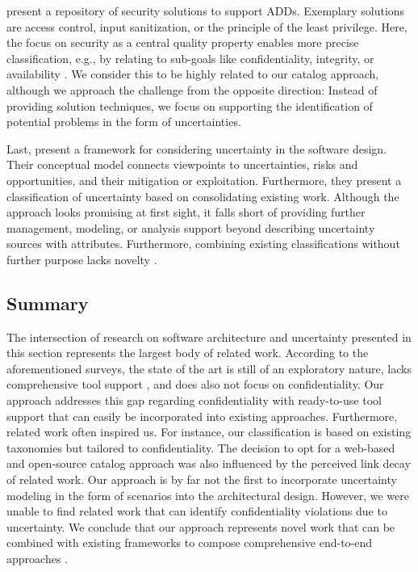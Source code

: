 \textcite{jasser_reusing_2016} present a repository of security solutions to support \acp{ADD}.
Exemplary solutions are access control, input sanitization, or the principle of the least privilege.
Here, the focus on security as a central quality property enables more precise classification, e.g., by relating to sub-goals like confidentiality, integrity, or availability \cite{international_organization_for_standardization_isoiec_2018}.
We consider this to be highly related to our catalog approach, although we approach the challenge from the opposite direction: Instead of providing solution techniques, we focus on supporting the identification of potential problems in the form of uncertainties.

Last, \textcite{lupafya_framework_2022} present a framework for considering uncertainty in the software design.
Their conceptual model connects viewpoints to uncertainties, risks and opportunities, and their mitigation or exploitation.
Furthermore, they present a classification of uncertainty based on consolidating existing work.
Although the approach looks promising at first sight, it falls short of providing further management, modeling, or analysis support beyond describing uncertainty sources with attributes.
Furthermore, combining existing classifications without further purpose lacks novelty \cite{kaplan_introducing_2022}.


\subsection{Summary}

The intersection of research on software architecture and uncertainty presented in this section represents the largest body of related work.
According to the aforementioned surveys, the state of the art is still of an exploratory nature, lacks comprehensive tool support \cite{troya_uncertainty_2021,hezavehi_uncertainty_2021}, and does also not focus on confidentiality.
Our approach addresses this gap regarding confidentiality with ready-to-use tool support that can easily be incorporated into existing approaches.
Furthermore, related work often inspired us.
For instance, our classification is based on existing taxonomies but tailored to confidentiality.
The decision to opt for a web-based and open-source catalog approach was also influenced by the perceived link decay \cite{goh_link_2007} of related work.
Our approach is by far not the first to incorporate uncertainty modeling in the form of scenarios into the architectural design.
However, we were unable to find related work that can identify confidentiality violations due to uncertainty.
We conclude that our approach represents novel work that can be combined with existing frameworks to compose comprehensive end-to-end approaches \cite{weyns_introduction_2020}.

